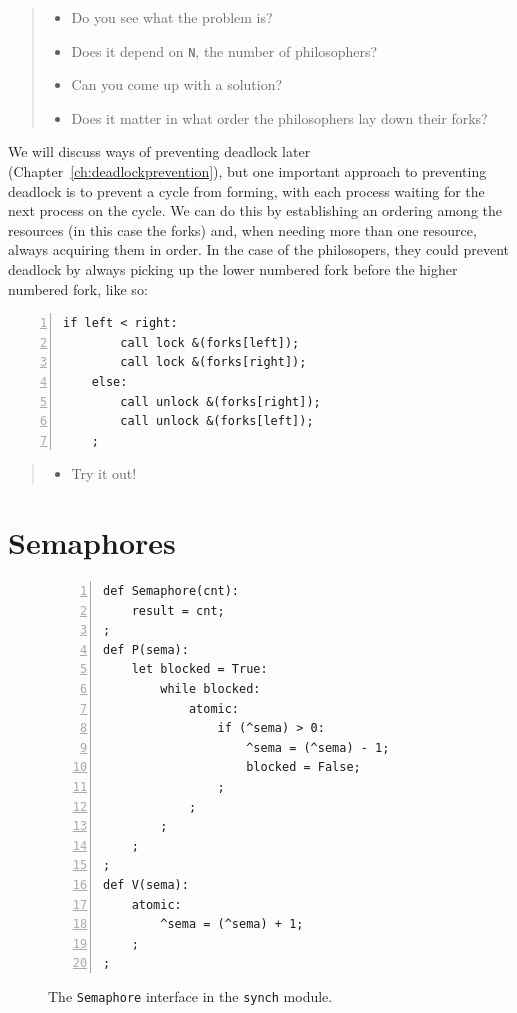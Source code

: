 \documentclass{report}
\newenvironment{code}{
\tcolorbox
}{
\endtcolorbox
}
\begin{document}
\begin{quote}
\begin{itemize}
\item Do you see what the problem is?
\item Does it depend on \texttt{N}, the number of philosophers?
\item Can you come up with a solution?
\item Does it matter in what order the philosophers lay down their forks?
\end{itemize}
\end{quote}

We will discuss ways of preventing deadlock later (Chapter~\ref{ch:deadlockprevention}),
but one important
approach to preventing deadlock is to prevent a cycle from forming, with each
process waiting for the next process on the cycle.
We can do this by establishing an ordering among the
resources (in this case the forks) and, when needing more than one
resource, always acquiring them in order.  In the case of the philosopers,
they could prevent deadlock by always picking up the lower numbered fork
before the higher numbered fork, like so:

\begin{code}
\begin{Verbatim}[xleftmargin=5mm,numbers=left]
    if left < right:
        call lock &(forks[left]);
        call lock &(forks[right]);
    else:
        call unlock &(forks[right]);
        call unlock &(forks[left]);
    ;
\end{Verbatim}
\end{code}

\begin{quote}
\begin{itemize}
\item Try it out!
\end{itemize}
\end{quote}

\chapter{Semaphores}
\label{ch:semaphore}

\begin{figure}
\begin{code}
\begin{Verbatim}[xleftmargin=5mm,numbers=left]
def Semaphore(cnt):
    result = cnt;
;
def P(sema):
    let blocked = True:
        while blocked:
            atomic:
                if (^sema) > 0:
                    ^sema = (^sema) - 1;
                    blocked = False;
                ;
            ;
        ;
    ;
;
def V(sema):
    atomic:
        ^sema = (^sema) + 1;
    ;
;
\end{Verbatim}
\end{code}
\caption{The \texttt{Semaphore} interface in the \texttt{synch} module.}
\label{fig:semaphore}
\end{figure}
\end{document}
